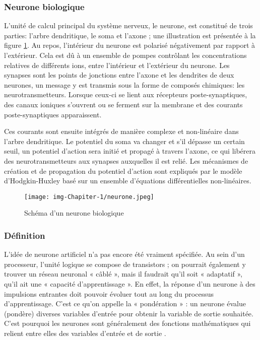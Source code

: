 \documentclass[12pt]{article}
\begin{document}
\subsubsection{Neurone biologique}
L’unité de calcul principal du système nerveux, le neurone, est constitué de trois parties: l’arbre dendritique, le soma et l’axone ; une illustration est présentée à la figure \ref{fig:nrb}. Au repos, l’intérieur du neurone est polarisé négativement par rapport à l’extérieur. Cela est dû à un ensemble de pompes contrôlant les concentrations relatives de différents ions, entre l’intérieur et l’extérieur du neurone. Les synapses sont les points de jonctions entre l’axone et les dendrites de deux neurones, un message y est transmis sous la forme de composés chimiques: les neurotransmetteurs. Lorsque ceux-ci se lient aux récepteurs poste-synaptiques, des canaux ioniques s’ouvrent ou se ferment sur la membrane et des courants poste-synaptiques apparaissent.

Ces courants sont ensuite intégrés de manière complexe et non-linéaire \cite{49} dans l’arbre dendritique. Le potentiel du soma va changer et s'il dépasse un certain seuil, un potentiel d’action sera initié et propagé à travers l’axone, ce qui libérera des neurotransmetteurs aux synapses auxquelles il est relié. Les mécanismes de création et de propagation du potentiel d’action sont expliqués par le modèle d’Hodgkin-Huxley \cite{50} basé sur un ensemble d’équations différentielles non-linéaires.
\begin{figure}[h]
\centering
\texttt{[image: img-Chapiter-1/neurone.jpeg]}
\caption{Schéma d’un neurone biologique}
\label{fig:nrb}
\end{figure}
\subsubsection{Définition}
L'idée de neurone artificiel n’a pas encore été vraiment spécifiée. Au sein d'un processeur, l’unité logique se compose de transistors ; on pourrait également y trouver un réseau neuronal « câblé », mais il faudrait qu’il soit « adaptatif », qu’il ait une « capacité d'apprentissage ». En effet, la réponse d'un neurone à des impulsions entrantes doit pouvoir évoluer tout au long du processus d'apprentissage. C'est ce qu'on appelle la « pondération » : un neurone évalue (pondère) diverses variables d'entrée pour obtenir la variable de sortie souhaitée. C'est pourquoi les neurones sont généralement des fonctions mathématiques qui relient entre elles des variables d'entrée et de sortie \cite{10}.
\end{document}
